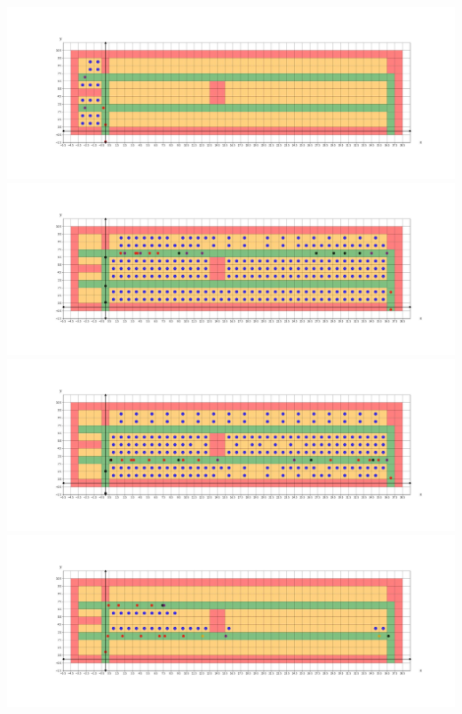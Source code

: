 \documentclass{article}
\theoremstyle{definition}
\theoremstyle{remark}
\numberwithin{equation}{section}
\begin{document}
	\begin{center}
		\includegraphics[width = 14cm]{doubleaisle1.jpg} \\
		\includegraphics[width = 14cm]{doubleaisle2.jpg} \\
		\clearpage
		\thispagestyle{empty}
		\includegraphics[width = 14cm]{doubleaisle3.jpg} \\
		\includegraphics[width = 14cm]{doubleaisle4.jpg} \\

	\end{center}
\end{document}

